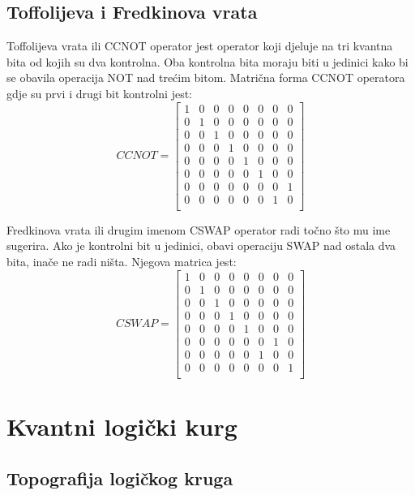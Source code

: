 \subsection{Toffolijeva i Fredkinova vrata}

Toffolijeva vrata ili CCNOT operator jest operator koji djeluje na tri kvantna bita od kojih su dva kontrolna. Oba kontrolna bita moraju biti u jedinici kako bi se obavila operacija NOT nad trećim bitom. Matrična forma CCNOT operatora gdje su prvi i drugi bit kontrolni jest:
\[
\textit{CCNOT}= \begin{bmatrix}
1 & 0 & 0 & 0 & 0 & 0 & 0 & 0 \\
0 & 1 & 0 & 0 & 0 & 0 & 0 & 0 \\
0 & 0 & 1 & 0 & 0 & 0 & 0 & 0 \\
0 & 0 & 0 & 1 & 0 & 0 & 0 & 0 \\
0 & 0 & 0 & 0 & 1 & 0 & 0 & 0 \\
0 & 0 & 0 & 0 & 0 & 1 & 0 & 0 \\
0 & 0 & 0 & 0 & 0 & 0 & 0 & 1 \\
0 & 0 & 0 & 0 & 0 & 0 & 1 & 0 \\
\end{bmatrix}
\]

Fredkinova vrata ili drugim imenom CSWAP operator radi točno što mu ime sugerira. Ako je kontrolni bit u jedinici, obavi operaciju SWAP nad ostala dva bita, inače ne radi ništa. Njegova matrica jest:
\[
\textit{CSWAP} = \begin{bmatrix}
1 & 0 & 0 & 0 & 0 & 0 & 0 & 0 \\
0 & 1 & 0 & 0 & 0 & 0 & 0 & 0 \\
0 & 0 & 1 & 0 & 0 & 0 & 0 & 0 \\
0 & 0 & 0 & 1 & 0 & 0 & 0 & 0 \\
0 & 0 & 0 & 0 & 1 & 0 & 0 & 0 \\
0 & 0 & 0 & 0 & 0 & 0 & 1 & 0 \\
0 & 0 & 0 & 0 & 0 & 1 & 0 & 0 \\
0 & 0 & 0 & 0 & 0 & 0 & 0 & 1 \\
\end{bmatrix}
\]

\section{Kvantni logički kurg}

\subsection{Topografija logičkog kruga}


